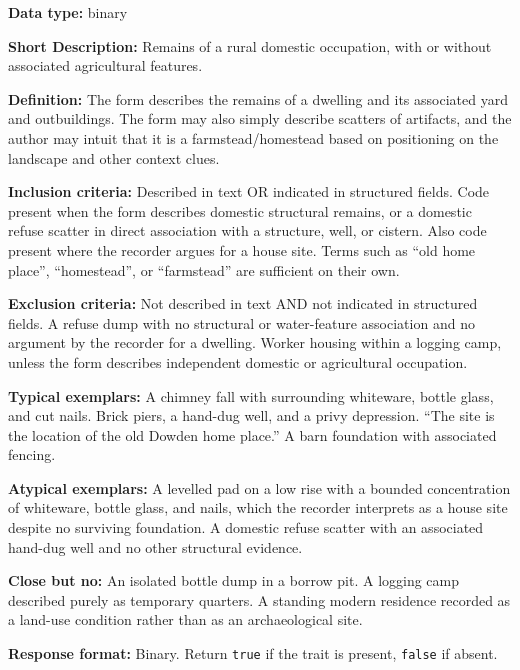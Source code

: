 \documentclass[
]{article}
\begin{document}
\textbf{Data type:} binary

\textbf{Short Description:} Remains of a rural domestic occupation, with
or without associated agricultural features.

\textbf{Definition:} The form describes the remains of a dwelling and
its associated yard and outbuildings. The form may also simply describe
scatters of artifacts, and the author may intuit that it is a
farmstead/homestead based on positioning on the landscape and other
context clues.

\textbf{Inclusion criteria:} Described in text OR indicated in
structured fields. Code present when the form describes domestic
structural remains, or a domestic refuse scatter in direct association
with a structure, well, or cistern. Also code present where the recorder
argues for a house site. Terms such as ``old home place'',
``homestead'', or ``farmstead'' are sufficient on their own.

\textbf{Exclusion criteria:} Not described in text AND not indicated in
structured fields. A refuse dump with no structural or water-feature
association and no argument by the recorder for a dwelling. Worker
housing within a logging camp, unless the form describes independent
domestic or agricultural occupation.

\textbf{Typical exemplars:} A chimney fall with surrounding whiteware,
bottle glass, and cut nails. Brick piers, a hand-dug well, and a privy
depression. ``The site is the location of the old Dowden home place.'' A
barn foundation with associated fencing.

\textbf{Atypical exemplars:} A levelled pad on a low rise with a bounded
concentration of whiteware, bottle glass, and nails, which the recorder
interprets as a house site despite no surviving foundation. A domestic
refuse scatter with an associated hand-dug well and no other structural
evidence.

\textbf{Close but no:} An isolated bottle dump in a borrow pit. A
logging camp described purely as temporary quarters. A standing modern
residence recorded as a land-use condition rather than as an
archaeological site.

\textbf{Response format:} Binary. Return \texttt{true} if the trait is
present, \texttt{false} if absent.
\end{document}
